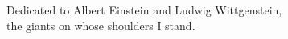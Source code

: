 
\begin{dedication} 

Dedicated to Albert Einstein and Ludwig Wittgenstein, \\ the giants on whose shoulders I stand. 

\end{dedication}